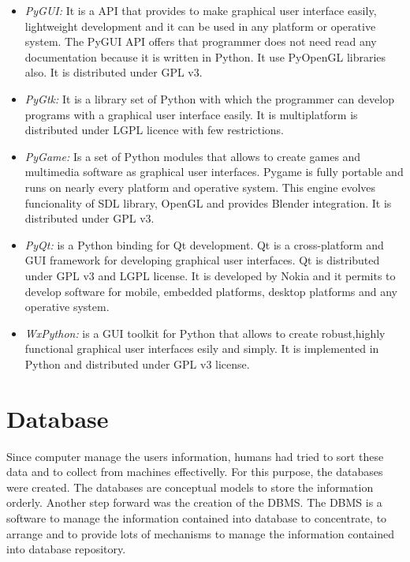 \begin{itemize}
\item \emph {PyGUI:} It is a \ac{API} that provides to make graphical user interface
  easily, lightweight development and it can be used in any platform or
  operative system. The PyGUI \ac{API} offers that programmer does
  not need read any documentation because it is written in Python. It use
  PyOpenGL libraries also. It is distributed under \ac{GPL} v3.
\item \emph{PyGtk:} It is a library set of Python with which the programmer can
  develop  programs with a graphical user interface easily. It is multiplatform
  is distributed under \ac{LGPL} licence with few restrictions.
\item \emph{PyGame:} Is a set of Python modules that allows to create games and
  multimedia software as graphical user interfaces. Pygame is fully portable and
  runs on nearly every platform and operative system. This engine evolves
  funcionality of \ac{SDL} library, OpenGL and provides Blender integration. It is
  distributed under \ac{GPL} v3.
\item \emph{PyQt:} is a Python binding for Qt development. Qt is a
  cross-platform  and \ac{GUI} framework for  developing graphical user interfaces. Qt
  is distributed under \ac{GPL} v3 and \ac{LGPL} license. It is developed by Nokia and it
  permits to develop software for mobile, embedded platforms, desktop platforms
  and any operative system.
\item \emph{WxPython:} is a \ac{GUI} toolkit for Python that allows to create
  robust,highly functional graphical user interfaces esily and simply. It is
  implemented in Python and distributed under \ac{GPL} v3 license.
\end{itemize}


\section{Database}
Since computer manage the users information, humans had tried to sort these data
and to collect from machines effectivelly. For this purpose, the databases were
created. The databases are conceptual models to store the information
orderly. Another step forward was the creation of the \ac{DBMS}. The \ac{DBMS}
is a software to manage the information contained into database to concentrate,
to arrange and to provide lots of mechanisms to manage the information contained
into database repository.

